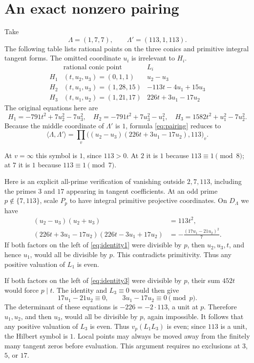 \documentclass[11pt,a4paper]{article}
\begin{document}
\section{An exact nonzero pairing}
Take
\[
 \Lambda=(1,7,7),\qquad \Lambda'=(113,1,113).
\]
The following table lists rational points on the three conics and primitive integral tangent forms. The omitted coordinate $u_i$ is irrelevant to $H_i$.
\[
\begin{array}{c|c|l}
 &\text{rational conic point}&L_i\\\hline
 H_1&(t,u_2,u_3)=(0,1,1)&u_2-u_3\\
 H_2&(t,u_1,u_3)=(1,28,15)&-113t-4u_1+15u_3\\
 H_3&(t,u_1,u_2)=(1,21,17)&226t+3u_1-17u_2
\end{array}
\]
The original equations here are
\[
 H_1=-791t^2+7u_2^2-7u_3^2,
 \quad H_2=-791t^2+7u_3^2-u_1^2,
 \quad H_3=1582t^2+u_1^2-7u_2^2.
\]
Because the middle coordinate of $\Lambda'$ is $1$, formula \eqref{eq:pairing} reduces to
\begin{equation}\label{eq:two}
 \langle\Lambda,\Lambda'\rangle
 =\prod_v\bigl((u_2-u_3)(226t+3u_1-17u_2),113\bigr)_v.
\end{equation}

At $v=\infty$ this symbol is $1$, since $113>0$. At $2$ it is $1$ because $113\equiv1\pmod8$; at $7$ it is $1$ because $113\equiv1\pmod7$.

Here is an explicit all-prime verification of vanishing outside $2,7,113$, including the primes $3$ and $17$ appearing in tangent coefficients. At an odd prime $p\notin\{7,113\}$, scale $P_p$ to have integral primitive projective coordinates. On $D_\Lambda$ we have
\begin{align}
 (u_2-u_3)(u_2+u_3)&=113t^2,\label{eq:identity1}\\
 (226t+3u_1-17u_2)(226t-3u_1+17u_2)
 &=-\frac{(17u_1-21u_2)^2}{7}.\label{eq:identity3}
\end{align}
If both factors on the left of \eqref{eq:identity1} were divisible by $p$, then $u_2,u_3,t$, and hence $u_1$, would all be divisible by $p$. This contradicts primitivity. Thus any positive valuation of $L_1$ is even.

If both factors on the left of \eqref{eq:identity3} were divisible by $p$, their sum $452t$ would force $p\mid t$. The identity and $L_3\equiv0$ would then give
\[
 17u_1-21u_2\equiv0,\qquad3u_1-17u_2\equiv0\pmod p.
\]
The determinant of these equations is $-226=-2\cdot113$, a unit at $p$. Therefore $u_1,u_2$, and then $u_3$, would all be divisible by $p$, again impossible. It follows that any positive valuation of $L_3$ is even. Thus $v_p(L_1L_3)$ is even; since $113$ is a unit, the Hilbert symbol is $1$. Local points may always be moved away from the finitely many tangent zeros before evaluation. This argument requires no exclusions at $3$, $5$, or $17$.
\end{document}
